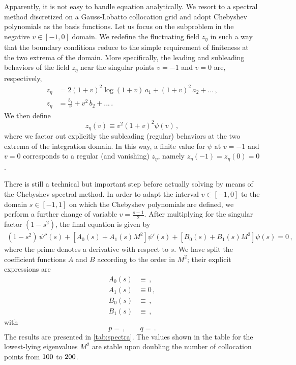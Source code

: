 Apparently, it is not easy to handle  equation  analytically.
We resort to a spectral method discretized on a Gauss-Lobatto collocation grid and adopt Chebyshev polynomials as the basis functions.
Let us focus on the subproblem in the negative $v\in\left[-1,0\right]$ domain.
We redefine the fluctuating field $z_\eta$ in such a way that the boundary conditions reduce to the simple requirement of finiteness at the two extrema of the domain.
More specifically, the leading and subleading behaviors of the field $z_\eta$ near the singular points $v=-1$ and $v=0$ are, respectively,
\begin{align}
	z_\eta &=
	2(1+v)^2 \log(1+v)\, a_1
	+
	(1+v)^2\, a_2 
	+ ...
	\,, \\
	z_\eta &=
	\frac{b_1}{v}
	+ v^2\, b_2 + ...\,.
\end{align}
We then define 
\begin{equation}
	z_\eta(v) 
	\equiv 
	v^2 (1+v)^2 \psi(v) \,,
\end{equation}
where we factor out explicitly the subleading (regular) behaviors at the two extrema of the integration domain.
In this way, a finite value for $\psi$ at $v=-1$ and $v=0$ corresponds to a regular (and vanishing) $z_\eta$, namely $z_\eta(-1)=z_\eta(0)=0$. 

There is still a technical but important step before actually solving by means of the Chebyshev spectral method.
In order to adapt the interval $v\in\left[-1,0\right]$ to the domain $s\in\left[-1,1\right]$ on which the Chebyshev polynomials are defined, we perform a further change of variable $v=\frac{s-1}{2}$.
After multiplying for the singular factor $(1-s^2)$, the final equation is given by
\begin{eqnarray}
	(1-s^2)\, \psi''(s)
	+ 
	\left[A_0(s) + A_1(s) M^2\right]\psi'(s)
	+
	\left[B_0(s) + B_1(s) M^2\right] \psi(s)
	=
	0\,,
\end{eqnarray}
where the prime denotes a derivative with respect to $s$. %
We have split the coefficient functions $A$ and $B$ according to the order in $M^2$; their explicit expressions are
\begin{align}
	A_0(s) &\equiv \,, \\
	A_1(s) &\equiv 0\,, \\
	B_0(s) &\equiv \,, \\
	B_1(s) &\equiv \,,
\end{align}
with
\begin{equation}
	p=\,,\qquad q=\,.
\end{equation}
The results are presented in \cref{tab:spectra}.
The values shown in the table for the lowest-lying eigenvalues $M^2$ are stable upon doubling the number of collocation points from $100$ to $200$.\\ 

